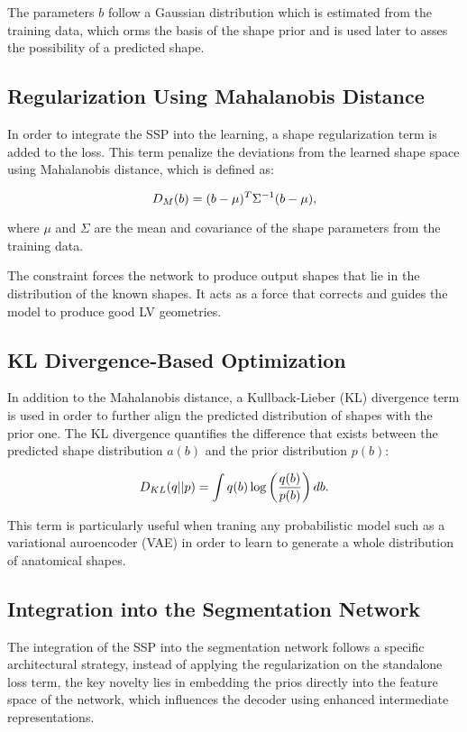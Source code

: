 The parameters $b$ follow a Gaussian distribution which is estimated from the training data, which orms the basis of the shape prior and is used later to asses the possibility of a predicted shape.

\subsection{Regularization Using Mahalanobis Distance}
In order to integrate the SSP into the learning, a shape regularization term is added to the loss. This term penalize the deviations from the learned shape space using Mahalanobis distance, which is defined as:

\begin{equation} 
\addcontentsline{equ}{equations}{\protect\numberline{\theequation}Mahalanobis Distance}
    D_M(b) = (b - \mu)^T \Sigma^{-1} (b - \mu), 
\end{equation}

where $\mu$ and $\Sigma$ are the mean and covariance of the shape parameters from the training data.

The constraint forces the network to produce output shapes that lie in the distribution of the known shapes. It acts as a force that corrects and guides the model to produce good LV geometries.

\subsection{KL Divergence-Based Optimization}
In addition to the Mahalanobis distance, a Kullback-Lieber (KL) divergence term is used in order to further align the predicted distribution of shapes with the prior one. The KL divergence quantifies the difference that exists between the predicted shape distribution $a(b)$ and the prior distribution $p(b)$:

\begin{equation} 
\addcontentsline{equ}{equations}{\protect\numberline{\theequation}KL Divergence}
    D_{KL}(q || p) = \int q(b) \log \left(\frac{q(b)}{p(b)}\right) db. 
\end{equation}

This term is particularly useful when traning any probabilistic model such as a variational auroencoder (VAE) in order to learn to generate a whole distribution of anatomical shapes.

\subsection{Integration into the Segmentation Network}
The integration of the SSP into the segmentation network follows a specific architectural strategy, instead of applying the regularization on the standalone loss term, the key novelty lies in embedding the prios directly into the feature space of the network, which influences the decoder using enhanced intermediate representations. 

